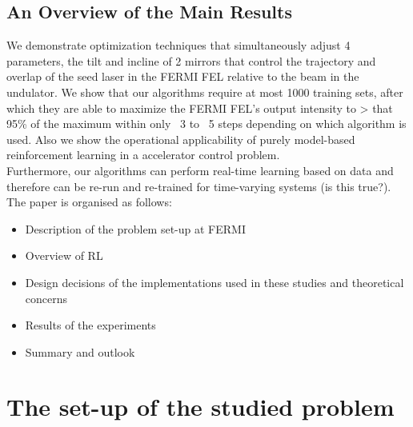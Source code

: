 \documentclass[
reprint,
amsmath,amssymb,amsfonts,clevref,
aps,
prstab,
]{revtex4-2}
\begin{document}
	 \subsection{An Overview of the Main Results}
	 We demonstrate optimization techniques that simultaneously adjust 4 parameters, the tilt and incline of 2 mirrors that control the trajectory and overlap of the seed laser in the FERMI FEL relative to the beam in the undulator. We show that our algorithms require at most 1000 training sets, after which they are able to maximize the FERMI FEL’s output intensity to > that 95\% of the maximum within only ~3 to ~5 steps depending on which algorithm is used. Also we show the operational applicability of purely model-based reinforcement learning in a accelerator control problem.\\
	  Furthermore, our algorithms can perform real-time learning based on data and therefore can be re-run and re-trained for time-varying systems (is this true?).
	The paper is organised as follows:
	\begin{itemize}
		\item Description of the problem set-up at FERMI
		\item Overview of RL
		\item Design decisions of the implementations used in these studies and theoretical concerns
		\item Results of the experiments 
		\item Summary and outlook
	\end{itemize}
	
	
	\section{The set-up of the studied problem}
\end{document}
